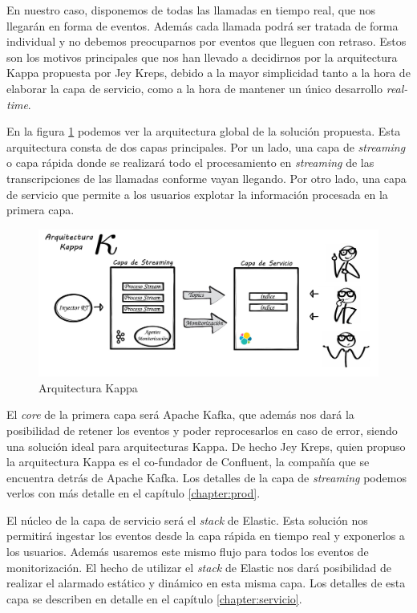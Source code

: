 En nuestro caso, disponemos de todas las llamadas en tiempo real, que nos llegarán en forma de eventos. Además cada llamada podrá ser tratada de forma individual y no debemos preocuparnos por eventos que lleguen con retraso. Estos son los motivos principales que nos han llevado a decidirnos por la arquitectura Kappa propuesta por Jey Kreps, debido a la mayor simplicidad tanto a la hora de elaborar la capa de servicio, como a la hora de mantener un único desarrollo \textit{real-time}. 






En la figura \ref{fig:kappa2} podemos ver la arquitectura global de la solución propuesta. Esta arquitectura consta de dos capas principales. Por un lado, una capa de \textit{streaming} o capa rápida donde se realizará todo el procesamiento en \textit{streaming} de las transcripciones de las llamadas conforme vayan llegando. Por otro lado, una capa de servicio que permite a los usuarios explotar la información procesada en la primera capa. 



\begin{figure}[!ht]
	\centering
	\includegraphics[width=1\textwidth]{images/arqu/kappa_v1}
	\caption{Arquitectura Kappa}
	\label{fig:kappa2}
\end{figure}


El \textit{core} de la primera capa será Apache Kafka, que además nos dará la posibilidad de retener los eventos y poder reprocesarlos en caso de error, siendo una solución ideal para arquitecturas Kappa. De hecho Jey Kreps, quien propuso la arquitectura Kappa es el co-fundador de Confluent, la compañía que se encuentra detrás de Apache Kafka. Los detalles de la capa de \textit{streaming} podemos verlos con más detalle en el capítulo \ref{chapter:prod}.

El núcleo de la capa de servicio será el \textit{stack} de Elastic. Esta solución nos permitirá ingestar los eventos desde la capa rápida en tiempo real y exponerlos a los usuarios. Además usaremos este mismo flujo para todos los eventos de monitorización. El hecho de utilizar el \textit{stack} de Elastic nos dará posibilidad de realizar el alarmado estático y dinámico en esta misma capa.  Los detalles de esta capa se describen en detalle en el capítulo \ref{chapter:servicio}. 





